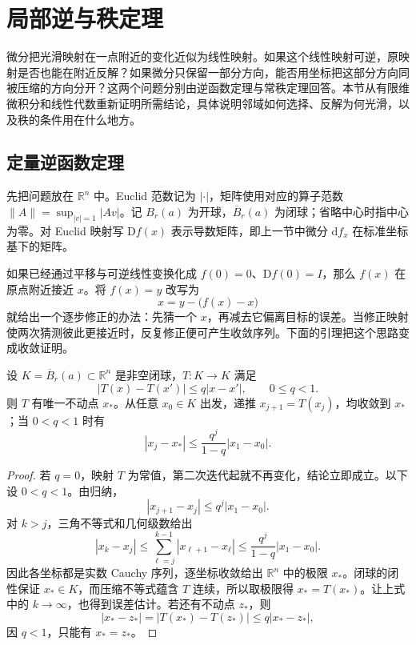 
% 
% 

\section{局部逆与秩定理}
\label{g1:sec:1103}

微分把光滑映射在一点附近的变化近似为线性映射。如果这个线性映射可逆，原映射是否也能在附近反解？如果微分只保留一部分方向，能否用坐标把这部分方向同被压缩的方向分开？这两个问题分别由逆函数定理与常秩定理回答。本节从有限维微积分和线性代数重新证明所需结论，具体说明邻域如何选择、反解为何光滑，以及秩的条件用在什么地方。

\subsection{定量逆函数定理}
\label{g1:subsec:1103:01}

先把问题放在 \(\mathbb R^n\) 中。Euclid 范数记为 \(|\cdot|\)，矩阵使用对应的算子范数 \(\|A\|=\sup_{|v|=1}|Av|\)。记 \(B_r(a)\) 为开球，\(\overline B_r(a)\) 为闭球；省略中心时指中心为零。对 Euclid 映射写 \(\mathrm{D}f(x)\) 表示导数矩阵，即上一节中微分 \(\mathrm{d}f_x\) 在标准坐标基下的矩阵。

\ProseParagraphBreak

如果已经通过平移与可逆线性变换化成 \(f(0)=0\)、\(\mathrm{D}f(0)=I\)，那么 \(f(x)\) 在原点附近接近 \(x\)。将 \(f(x)=y\) 改写为
\[
	x=y-\bigl(f(x)-x\bigr)
\]
就给出一个逐步修正的办法：先猜一个 \(x\)，再减去它偏离目标的误差。当修正映射使两次猜测彼此更接近时，反复修正便可产生收敛序列。下面的引理把这个思路变成收敛证明。

\begin{lemma}
	\label{g1:lem:euclidean-contraction}
	设 \(K=\overline B_r(a)\subset\mathbb R^n\) 是非空闭球，\(T:K\to K\) 满足
	\[
		|T(x)-T(x')|\leq q|x-x'|,\qquad 0\leq q<1.
	\]
	则 \(T\) 有唯一不动点 \(x_*\)。从任意 \(x_0\in K\) 出发，递推 \(x_{j+1}=T(x_j)\)，均收敛到 \(x_*\)；当 \(0<q<1\) 时有
	\[
		|x_j-x_*|\leq\frac{q^j}{1-q}|x_1-x_0|.
	\]
\end{lemma}
\begin{proof}
	若 \(q=0\)，映射 \(T\) 为常值，第二次迭代起就不再变化，结论立即成立。以下设 \(0<q<1\)。由归纳，
	\[
		|x_{j+1}-x_j|\leq q^j|x_1-x_0|.
	\]
	对 \(k>j\)，三角不等式和几何级数给出
	\[
		|x_k-x_j|\leq\sum_{\ell=j}^{k-1}|x_{\ell+1}-x_\ell|
		\leq\frac{q^j}{1-q}|x_1-x_0|.
	\]
	因此各坐标都是实数 Cauchy 序列，逐坐标收敛给出 \(\mathbb R^n\) 中的极限 \(x_*\)。闭球的闭性保证 \(x_*\in K\)，而压缩不等式蕴含 \(T\) 连续，所以取极限得 \(x_*=T(x_*)\)。让上式中的 \(k\to\infty\)，也得到误差估计。若还有不动点 \(z_*\)，则
	\[
		|x_*-z_*|=|T(x_*)-T(z_*)|\leq q|x_*-z_*|,
	\]
	因 \(q<1\)，只能有 \(x_*=z_*\)。
\end{proof}

